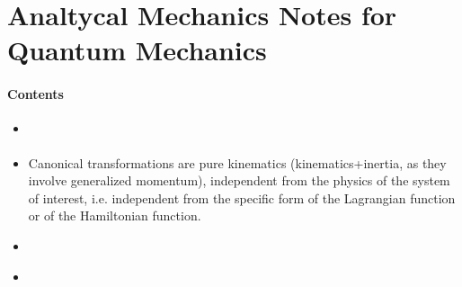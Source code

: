 \documentclass[letterpaper,10pt,english]{jupyterBook}
\begin{document}
\chapter{Analtycal Mechanics \sphinxhyphen{} Notes for Quantum Mechanics}
\label{\detokenize{ch/quantum-mechanics/analytical-mechanics:analtycal-mechanics-notes-for-quantum-mechanics}}\label{\detokenize{ch/quantum-mechanics/analytical-mechanics:quantum-mechanics-analytical-mechanics}}\label{\detokenize{ch/quantum-mechanics/analytical-mechanics::doc}}\subsubsection*{Contents}
\begin{itemize}
\item {} 
\sphinxAtStartPar
{\hyperref[\detokenize{ch/quantum-mechanics/analytical-mechanics:quantum-mechanics-analytical-mechanics-lagrange-hamilton}]{}}

\item {} 
\sphinxAtStartPar
{\hyperref[\detokenize{ch/quantum-mechanics/analytical-mechanics:quantum-mechanics-analytical-mechanics-canonical-transformations}]{}} Canonical transformations are pure kinematics (kinematics+inertia, as they involve generalized momentum), independent from the physics of the system of interest, i.e. independent from the specific form of the Lagrangian function or of the Hamiltonian function.

\item {} 
\sphinxAtStartPar
{\hyperref[\detokenize{ch/quantum-mechanics/analytical-mechanics:quantum-mechanics-analytical-mechanics-hamilton-jacobi}]{}}

\item {} 
\sphinxAtStartPar
{\hyperref[\detokenize{ch/quantum-mechanics/analytical-mechanics:quantum-mechanics-analytical-mechanics-angle-action}]{}}

\end{itemize}
\end{document}

